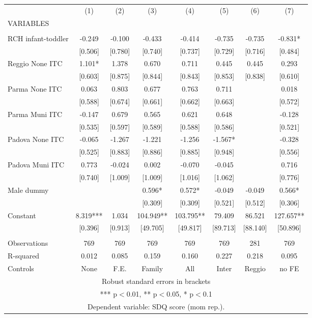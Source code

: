\begin{tabular}{lccccccc} \hline
 & (1) & (2) & (3) & (4) & (5) & (6) & (7) \\
VARIABLES &  &  &  &  &  &  &  \\ \hline
 &  &  &  &  &  &  &  \\
RCH infant-toddler & -0.249 & -0.100 & -0.433 & -0.414 & -0.735 & -0.735 & -0.831* \\
 & [0.506] & [0.780] & [0.740] & [0.737] & [0.729] & [0.716] & [0.484] \\
Reggio None ITC & 1.101* & 1.378 & 0.670 & 0.711 & 0.445 & 0.445 & 0.293 \\
 & [0.603] & [0.875] & [0.844] & [0.843] & [0.853] & [0.838] & [0.610] \\
Parma None ITC & 0.063 & 0.803 & 0.677 & 0.763 & 0.711 &  & 0.018 \\
 & [0.588] & [0.674] & [0.661] & [0.662] & [0.663] &  & [0.572] \\
Parma Muni ITC & -0.147 & 0.679 & 0.565 & 0.621 & 0.648 &  & -0.128 \\
 & [0.535] & [0.597] & [0.589] & [0.588] & [0.586] &  & [0.521] \\
Padova None ITC & -0.065 & -1.267 & -1.221 & -1.256 & -1.567* &  & -0.328 \\
 & [0.525] & [0.883] & [0.886] & [0.885] & [0.948] &  & [0.556] \\
Padova Muni ITC & 0.773 & -0.024 & 0.002 & -0.070 & -0.045 &  & 0.716 \\
 & [0.740] & [1.009] & [1.009] & [1.016] & [1.062] &  & [0.776] \\
Male dummy &  &  & 0.596* & 0.572* & -0.049 & -0.049 & 0.566* \\
 &  &  & [0.309] & [0.309] & [0.521] & [0.512] & [0.306] \\
Constant & 8.319*** & 1.034 & 104.949** & 103.795** & 79.409 & 86.521 & 127.657** \\
 & [0.396] & [0.913] & [49.705] & [49.817] & [89.713] & [88.140] & [50.896] \\
 &  &  &  &  &  &  &  \\
Observations & 769 & 769 & 769 & 769 & 769 & 281 & 769 \\
R-squared & 0.012 & 0.085 & 0.159 & 0.160 & 0.227 & 0.218 & 0.095 \\
 Controls & None & F.E. & Family & All & Inter & Reggio & no FE \\ \hline
\multicolumn{8}{c}{ Robust standard errors in brackets} \\
\multicolumn{8}{c}{ *** p$<$0.01, ** p$<$0.05, * p$<$0.1} \\
\multicolumn{8}{c}{ Dependent variable: SDQ score (mom rep.).} \\
\end{tabular}

